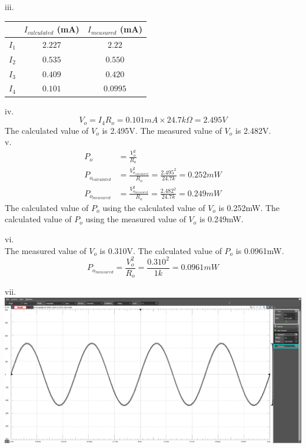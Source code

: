 \documentclass[12pt]{article}
\begin{document}
iii.

\begin{tabular}{|c|c|c|}
    \hline
     & $I_{calculated}$ (mA) & $I_{measured}$ (mA) \\ \hline
    $I_1$ & $2.227$ & $2.22$ \\ \hline
    $I_2$ & $0.535$ & $0.550$ \\ \hline
    $I_3$ & $0.409$ & $0.420$ \\ \hline
    $I_4$ & $0.101$ & $0.0995$ \\ \hline
\end{tabular}

iv. \\
\[
    V_o = I_4R_o = 0.101mA \times 24.7k\Omega = 2.495V
\]
The calculated value of $V_o$ is 2.495V. The measured value of $V_o$ is 2.482V. \\
\newpage
v.
\begin{align*}
    P_o & = \frac{V_o^2}{R_o} \\ 
    P_{o_{calculated}} & = \frac{V_{o_{calculated}}^2}{R_o} = \frac{2.495^2}{24.7k} = 0.252mW \\
    P_{o_{measured}} & = \frac{V_{o_{measured}}^2}{R_o} = \frac{2.482^2}{24.7k} = 0.249mW 
\end{align*}
The calculated value of $P_o$ using the calculated value of $V_o$ is 0.252mW. The calculated value of $P_o$ using the measured value of $V_o$ is 0.249mW.

vi. \\
The measured value of $V_o$ is 0.310V. The calculated value of $P_o$ is 0.0961mW.
\[
    P_{o_{measured}} = \frac{V_o^2}{R_o} = \frac{0.310^2}{1k} = 0.0961mW
\]

vii. \\

\includegraphics[width=\textwidth]{prelab5sinwave.png}
\end{document}
